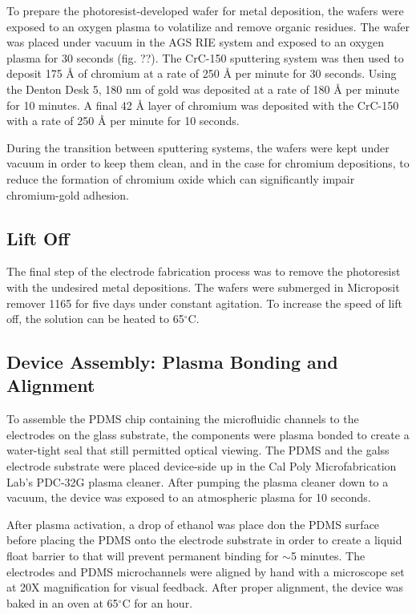 \par To prepare the photoresist-developed wafer for metal deposition, the wafers were exposed to an oxygen plasma to volatilize and remove organic residues. The wafer was placed under vacuum in the AGS RIE system and exposed to an oxygen plasma for 30 seconds (fig. ??). The CrC-150 sputtering system was then used to deposit 175 \si{\angstrom} of chromium at a rate of 250 \si{\angstrom} per minute for 30 seconds. Using the Denton Desk 5, 180 nm of gold was deposited at a rate of 180 \si{\angstrom} per minute for 10 minutes. A final 42 \si{\angstrom} layer of chromium was deposited with the CrC-150 with a rate of 250 \si{\angstrom} per minute for 10 seconds. 

\par During the transition between sputtering systems, the wafers were kept under vacuum in order to keep them clean, and in the case for chromium depositions, to reduce the formation of chromium oxide which can significantly impair chromium-gold adhesion.

\subsection*{Lift Off}

The final step of the electrode fabrication process was to remove the photoresist with the undesired metal depositions. The wafers were submerged in Microposit remover 1165 for five days under constant agitation. To increase the speed of lift off, the solution can be heated to 65$^\circ$C.

\subsection{Device Assembly: Plasma Bonding and Alignment}
\par To assemble the PDMS chip containing the microfluidic channels to the electrodes on the glass substrate, the components were plasma bonded to create a water-tight seal that still permitted optical viewing. The PDMS and the galss electrode substrate were placed device-side up in the Cal Poly Microfabrication Lab's PDC-32G plasma cleaner. After pumping the plasma cleaner down to a vacuum, the device was exposed to an atmospheric plasma for 10 seconds.  

\par After plasma activation, a drop of ethanol was place don the PDMS surface before placing the PDMS onto the electrode substrate in order to create a liquid float barrier to that will prevent permanent binding for $\sim$5 minutes. The electrodes and PDMS microchannels were aligned by hand with a microscope set at 20X magnification for visual feedback. After proper alignment, the device was baked in an oven at 65$^\circ$C for an hour. 


